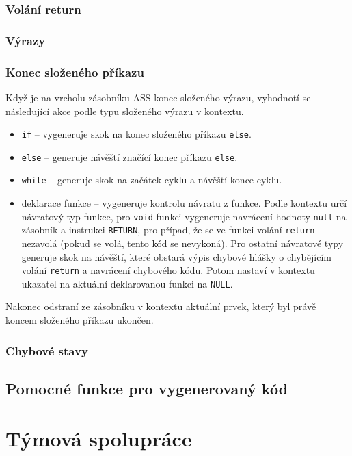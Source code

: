\documentclass[a4paper, 12pt]{article}
\begin{document}
    \subsubsection{Volání return}
    \subsubsection{Výrazy}
    \subsubsection{Konec složeného příkazu} \label{konec slozeneho}
    Když je na vrcholu zásobníku ASS konec složeného výrazu, vyhodnotí se následující akce podle typu složeného výrazu v kontextu.
    \begin{itemize}
        \item \texttt{if} -- vygeneruje skok na konec složeného příkazu \texttt{else}.
        \item \texttt{else} -- generuje návěští značící konec příkazu \texttt{else}.
        \item \texttt{while} -- generuje skok na začátek cyklu a návěští konce cyklu.
        \item deklarace funkce -- vygeneruje kontrolu návratu z funkce. Podle kontextu určí návratový typ funkce, pro \texttt{void} funkci vygeneruje navrácení hodnoty \texttt{null} na zásobník a instrukci \texttt{RETURN}, pro případ, že se ve funkci volání \texttt{return} nezavolá (pokud se volá, tento kód se nevykoná). Pro ostatní návratové typy generuje skok na návěští, které obstará výpis chybové hlášky o chybějícím volání \texttt{return} a navrácení chybového kódu. Potom nastaví v kontextu ukazatel na aktuální deklarovanou funkci na \texttt{NULL}.
    \end{itemize}

    Nakonec odstraní ze zásobníku v kontextu aktuální prvek, který byl právě koncem složeného příkazu ukončen.
    \subsubsection{Chybové stavy}

    \subsection{Pomocné funkce pro vygenerovaný kód} \label{pomocne}

    \section{Týmová spolupráce}
\end{document}
